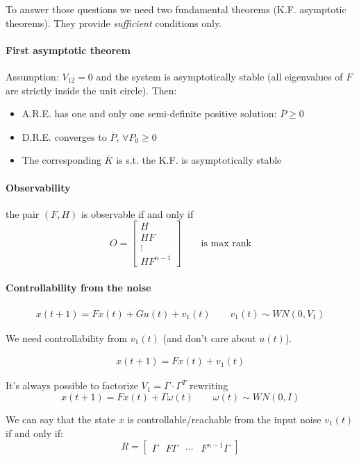 
To answer those questions we need two fundamental theorems (K.F. asymptotic theorems).
They provide \emph{sufficient} conditions only.

\paragraph{First asymptotic theorem}

Assumption: $V_{12} = 0$ and the system is asymptotically stable (all eigenvalues of $F$ are strictly inside the unit circle).
Then:
\begin{itemize}
    \item A.R.E. has one and only one semi-definite positive solution: $\overline{P} \ge 0$
    \item D.R.E. converges to $\overline{P}$, $\forall P_0 \ge 0$
    \item The corresponding $\overline{K}$ is s.t. the K.F. is asymptotically stable
\end{itemize}

\begin{rem}
    \paragraph{Observability} the pair $(F, H)$ is observable if and only if
    \[
        O = \begin{bmatrix}
            H \\
            HF \\
            \vdots \\
            HF^{n-1}
        \end{bmatrix}
        \qquad
        \text{is max rank}
    \]

    \paragraph{Controllability from the noise}

    \begin{align*}
        x(t+1) = Fx(t) + Gu(t) + v_1(t) \qquad v_1(t) \sim WN(0, V_1)
    \end{align*}

    We need controllability from $v_1(t)$ (and don't care about $u(t)$).

    \begin{align*}
        x(t+1) = Fx(t) + v_1(t)
    \end{align*}

    It's always possible to factorize $V_1 = \Gamma\cdot\Gamma^T$ rewriting
    \[
        x(t+1) = Fx(t) + \Gamma\omega(t) \qquad \omega(t) \sim WN(0, I)
    \]

    We can say that the state $x$ is controllable/reachable from the input noise $v_1(t)$ if and only if:
    \[
        R = \begin{bmatrix}
            \Gamma & F\Gamma & \cdots & F^{n-1}\Gamma
        \end{bmatrix}
    \]
\end{rem}

